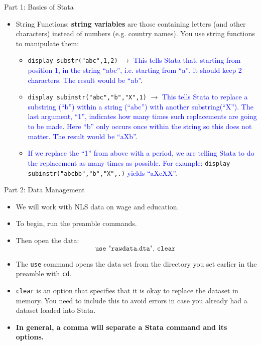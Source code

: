 \documentclass[11pt,notes=hide,aspectratio=169,mathserif]{beamer}
\begin{document}
\begin{frame}{Part 1: Basics of Stata}
\begin{itemize}
\item String Functions: \textbf{string variables} are those containing letters (and other characters) instead of numbers (e.g. country names). You use string functions to manipulate them: \medskip
        \begin{itemize}
        \item \texttt{display substr("abc",1,2)} $\rightarrow$ \textcolor{blue}{This tells Stata that, starting from position 1, in the string ``abc'', i.e. starting from ``a'', it should keep 2 characters. The result would be ``ab''.} \smallskip
        \item \texttt{display subinstr("abc","b","X",1)} $\rightarrow$ \textcolor{blue}{This tells Stata to replace a substring (``b'') within a string (``abc'') with another substring(``X''). The last argument, ``1'', indicates how many times such replacements are going to be made. Here ``b'' only occurs once within the string so this does not matter. The result would be ``aXb''. }\smallskip
        \item \textcolor{blue}{If we replace the ``1'' from above with a period, we are telling Stata to do the replacement as many times as possible. For example:} \texttt{display subinstr("abcbb","b","X",.)} \textcolor{blue}{yields ``aXcXX''}. 
    \end{itemize}
\end{itemize}    
\end{frame}

\begin{frame}{Part 2: Data Management}
\begin{itemize}
    \item We will work with NLS data on wage and education. \smallskip
    \item To begin, run the preamble commands. \smallskip
    \item Then open the data:
    $$\texttt{use "rawdata.dta", clear }$$ 
    \item The \texttt{use} command opens the data set from the directory you set earlier in the preamble with \texttt{cd}. \smallskip
    \item \texttt{clear} is an option that specifies that it is okay to replace the dataset in memory. You need to include this to avoid errors in case you already had a dataset loaded into Stata.
    \item \textbf{In general, a comma will separate a Stata command and its options.}
\end{itemize}
\end{frame}
\end{document}
